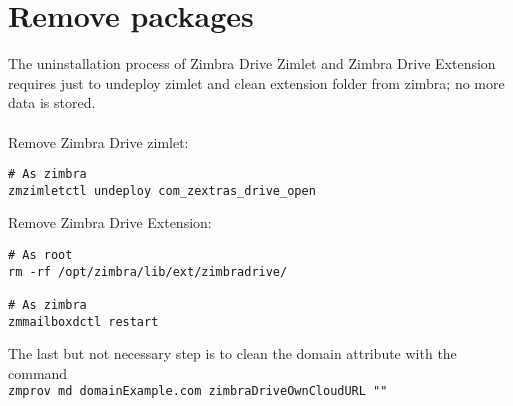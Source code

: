 \section{Remove packages}
The uninstallation process of Zimbra Drive Zimlet and Zimbra Drive Extension requires just to undeploy zimlet and clean extension folder from zimbra;
no more data is stored.\\ \\
Remove Zimbra Drive zimlet:
\begin{verbatim}
# As zimbra
zmzimletctl undeploy com_zextras_drive_open
\end{verbatim}
Remove Zimbra Drive Extension:
\begin{verbatim}
# As root
rm -rf /opt/zimbra/lib/ext/zimbradrive/

# As zimbra
zmmailboxdctl restart
\end{verbatim}
The last but not necessary step is to clean the domain attribute with the command\\
\texttt{zmprov md domainExample.com zimbraDriveOwnCloudURL ""}
